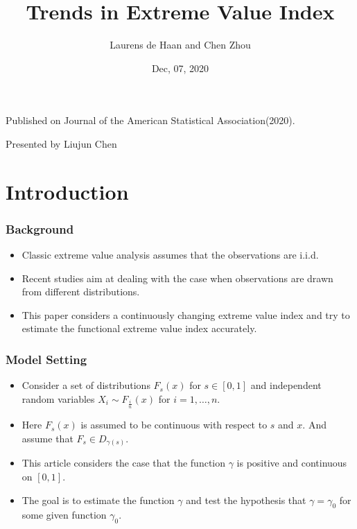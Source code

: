 \documentclass{beamer}
\author{Laurens de Haan and Chen Zhou }
\date{Dec, 07, 2020}
\title{Trends in Extreme Value Index}
\begin{document}
\begin{frame}
\titlepage
\begin{center}
    Published on Journal of the American Statistical Association(2020).

    \bigskip
    Presented by Liujun Chen

\end{center}
\end{frame}




\section{Introduction}

\begin{frame}
    \frametitle{Background}
\begin{itemize}
    \item Classic extreme value analysis assumes that the observations are i.i.d.
    \bigskip
    \item Recent studies aim at dealing with the case when observations are drawn from different distributions.
    \bigskip
    \item This paper considers a continuously changing extreme value index and try to estimate the functional extreme value index accurately.
\end{itemize}
\end{frame}

\begin{frame}
    \frametitle{Model Setting}
\begin{itemize}
    \item Consider a set of distributions $F_s(x)$ for $s\in [0,1]$ and independent random variables $X_i\sim F_{\frac{i}{n}}(x)$ for $i=1,\dots,n$.
    \medskip
    \item Here $F_s(x)$ is assumed to be continuous with respect to $s$ and $x$. And assume that $F_s \in D_{\gamma(s)}$.
    \medskip
    \item This article considers the case that the function $\gamma$ is positive and continuous on $[0,1]$.
    \medskip
    \item The goal is to estimate the function $\gamma$ and test the hypothesis that $\gamma=\gamma_0$ for some given function $\gamma_0$.
\end{itemize}

\end{frame}
\end{document}
